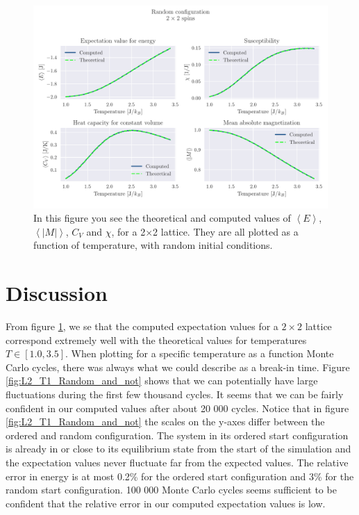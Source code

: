 \documentclass[reprint, english,notitlepage,nofootinbib]{revtex4-1}  %
\begin{document}
\begin{figure}[!htb]
	\includegraphics[width=\linewidth]{../output/c/L2-T1-dT0_01-NT240-N6-RandomFalse-CompTemp.pdf}
	\caption{In this figure you see the theoretical and computed values of $\left<E\right>$, $\left<|M|\right>$, $C_V$ and $\chi$, for a 2$\times$2 lattice. They are all plotted as a function of temperature, with random initial conditions.}
	\label{fig:L2_Random}
\end{figure}
\section{Discussion}

From figure \ref{fig:L2_Random}, we se that the computed expectation values for a $2 \times 2$ lattice correspond extremely well with the theoretical values for temperatures $T \in [1.0, 3.5]$. When plotting for a specific temperature as a function Monte Carlo cycles, there was always what we could describe as a break-in time. Figure \ref{fig:L2_T1_Random_and_not} shows that we can potentially have large fluctuations during the first few thousand cycles. It seems that we can be fairly confident in our computed values after about 20 000 cycles. Notice that in figure \ref{fig:L2_T1_Random_and_not} the scales on the y-axes differ between the ordered and random configuration. The system in its ordered start configuration is already in or close to its equilibrium state from the start of the simulation and the expectation values never fluctuate far from the expected values. The relative error in energy is at most 0.2\% for the ordered start configuration and 3\% for the random start configuration. 100 000 Monte Carlo cycles seems sufficient to be confident that the relative error in our computed expectation values is low.
\end{document}
